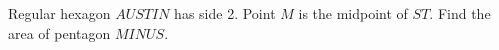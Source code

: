 Regular hexagon $AUSTIN$ has side 2. Point $M$ is the midpoint of $ST$. Find the area of pentagon $MINUS$.
